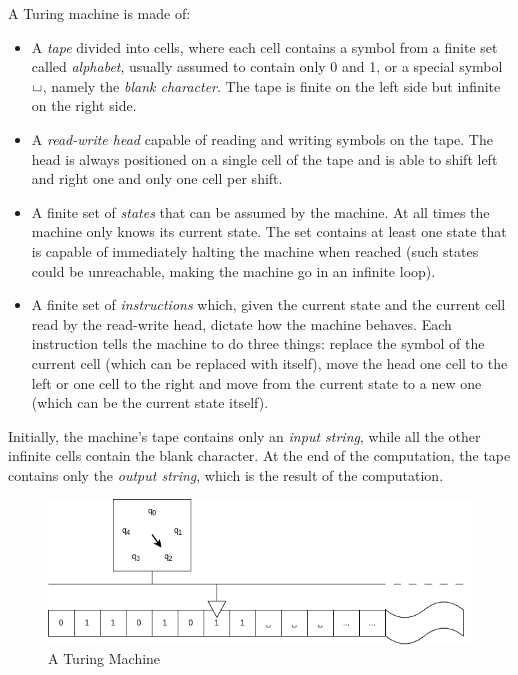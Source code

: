 A Turing machine is made of:
\begin{itemize}
    \item A \textit{tape} divided into cells, where each cell contains a symbol from a finite set called \textit{alphabet}, usually assumed to contain only 0 and 1, or a special symbol $\blankchar$, namely the \textit{blank character}. The tape is finite on the left side but infinite on the right side. 
    \item A \textit{read-write head} capable of reading and writing symbols on the tape. The head is always positioned on a single cell of the tape and is able to shift left and right one and only one cell per shift.
    \item A finite set of \textit{states} that can be assumed by the machine. At all times the machine only knows its current state. The set contains at least one state that is capable of immediately halting the machine when reached (such states could be unreachable, making the machine go in an infinite loop).
    \item A finite set of \textit{instructions} which, given the current state and the current cell read by the read-write head, dictate how the machine behaves. Each instruction tells the machine to do three things: replace the symbol of the current cell (which can be replaced with itself), move the head one cell to the left or one cell to the right and move from the current state to a new one (which can be the current state itself).
\end{itemize}

Initially, the machine's tape contains only an \textit{input string}, while all the other infinite cells contain the blank character. At the end of the computation, the tape contains only the \textit{output string}, which is the result of the computation.

\begin{figure}[H]
    \centering
    \includegraphics[scale=0.5]{resources/images/tm.png}

    \caption{A Turing Machine}
\end{figure}

